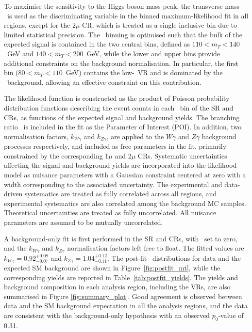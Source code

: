
To maximise the sensitivity to the Higgs boson mass peak, the transverse mass \mT\ is used as the discriminating variable in the binned maximum-likelihood fit in all regions, except for the $2\mu$ CR, which is treated as a single inclusive bin due to limited statistical precision. 
The \mT\ binning is optimised such that the bulk of the expected signal is contained in the two central bins, defined as $110<m_T<140$~GeV and $140<m_T<200$~GeV, while the lower and upper bins provide additional constraints on the background normalisation. In particular, the first bin ($80<m_T<110$~GeV) contains the low-\mT\ VR and is dominated by the \efakey\ background, allowing an effective constraint on this contribution.

The likelihood function is constructed as the product of Poisson probability distribution functions describing the event counts in each \mT\ bin of the SR and CRs, as functions of the expected signal and background yields. The branching ratio \br\ is included in the fit as the Parameter of Interest (POI). In addition, two  normalisation factors, $k_{W\gamma}$ and $k_{Z\gamma}$, are applied to the $W\gamma$ and $Z\gamma$ background processes respectively, and included as free parameters in the fit, primarily constrained by the corresponding 1$\mu$ and 2$\mu$ CRs.
Systematic uncertainties affecting the signal and background yields are incorporated into the likelihood model as nuisance parameters with a Gaussian constraint centered at zero with a width corresponding to the associated uncertainty. The experimental and data-driven systematics are treated as fully correlated across all regions, and experimental systematics are also correlated among the background MC samples. Theoretical uncertainties are treated as fully uncorrelated. All nuisance parameters are assumed to be mutually uncorrelated.

A background-only fit is first performed in the SR and CRs, with \br\ set to zero, and  the $k_{W\gamma}$ and $k_{Z\gamma}$ normalisation factors left free to float. The fitted values are
$k_{W\gamma} = 0.92^{+0.08}_{-0.07}$ and
$k_{Z\gamma} = 1.04^{+0.12}_{-0.11}$. 
The post-fit \mT\ distributions for data and the expected SM background are shown in Figure~\ref{fig:postfit_mt}, while the corresponding yields are reported in Table~\ref{tab:postfit_yields}. The yields and background composition in each analysis region, including the VRs, are also summarised in Figure \ref{fig:summary_plot}. Good agreement is observed between data and the SM background expectation in all the analysis regions, and the data are consistent with the background-only hypothesis with an observed $p_0$-value of 0.31. 

